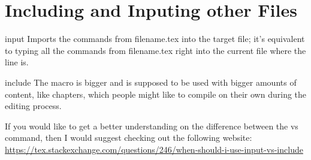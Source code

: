 \section{Including and Inputing other Files}
\vspace{10.5cm}
	\begin{docCommand}{input}{}
		Imports the commands from filename.tex into the target file; it's equivalent to typing all the commands from filename.tex right into the current file where the  line is. 
	\end{docCommand}
	\begin{docCommand}{include}{}
		The  macro is bigger and is supposed to be used with bigger amounts of content, like chapters, which people might like to compile on their own during the editing process.
	\end{docCommand}
If you would like to get a better understanding on the difference between the  vs  command, then I would suggest checking out the following website:\\ 
\url{https://tex.stackexchange.com/questions/246/when-should-i-use-input-vs-include}\\
\newpage
